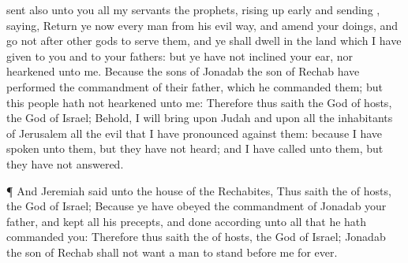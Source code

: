 {sent also unto you all my
servants the
prophets, rising up
early and
sending
{},
saying,
Return ye now every
man from his
evil
way, and
amend your
doings, and
go not
after
other
gods to
serve them, and ye shall dwell
in the
land which I have
given to you and to your
fathers: but ye have not
inclined your
ear, nor
hearkened unto me.
Because the
sons of
Jonadab the
son of
Rechab have
performed the
commandment of their
father, which he
commanded them; but this
people hath not
hearkened unto me:
Therefore thus
saith the
{}
God of
hosts, the
God of
Israel; Behold, I will
bring upon
Judah and upon all the
inhabitants of
Jerusalem all the
evil that I have
pronounced against them: because I have
spoken unto them, but they have not
heard; and I have
called unto them, but they have not
answered.
\par }{\PP {}¶ And
Jeremiah
said unto the
house of the
Rechabites, Thus
saith the
{} of
hosts, the
God of
Israel; Because ye have
obeyed the
commandment of
Jonadab your
father, and
kept all his
precepts, and
done according unto all that he hath
commanded you:
Therefore thus
saith the
{} of
hosts, the
God of
Israel;
Jonadab the
son of
Rechab shall not
want a
man to
stand
before me for
ever.

}
